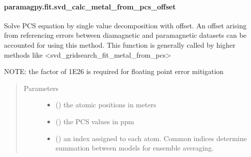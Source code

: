 \documentclass[a4paper,10pt,english,openany,oneside]{sphinxmanual}
\begin{document}
\paragraph{paramagpy.fit.svd\_calc\_metal\_from\_pcs\_offset}
\label{\detokenize{reference/generated/paramagpy.fit.svd_calc_metal_from_pcs_offset:paramagpy-fit-svd-calc-metal-from-pcs-offset}}\label{\detokenize{reference/generated/paramagpy.fit.svd_calc_metal_from_pcs_offset::doc}}

\begin{fulllineitems}
\label{\detokenize{reference/generated/paramagpy.fit.svd_calc_metal_from_pcs_offset:paramagpy.fit.svd_calc_metal_from_pcs_offset}}
Solve PCS equation by single value decomposition with offset.
An offset arising from referencing errors between diamagnetic
and paramagnetic datasets can be accounted for using this method.
This function is generally called by higher methods like
\textless{}svd\_gridsearch\_fit\_metal\_from\_pcs\textgreater{}

NOTE: the factor of 1E26 is required for floating point error mitigation
\begin{quote}\begin{description}
\item[{Parameters}] \leavevmode\begin{itemize}
\item {} 
 (\sphinxstyleliteralemphasis{\sphinxupquote{ {[}}}\sphinxstyleliteralemphasis{\sphinxupquote{,}}\sphinxstyleliteralemphasis{\sphinxupquote{,}}\sphinxstyleliteralemphasis{\sphinxupquote{{]} }}) \textendash{} the atomic positions in meters

\item {} 
 () \textendash{} the PCS values in ppm

\item {} 
 () \textendash{} an index assigned to each atom. Common indices determine summation
between models for ensemble averaging.


\end{itemize}
\end{description}
\end{quote}
\end{fulllineitems}
\end{document}
